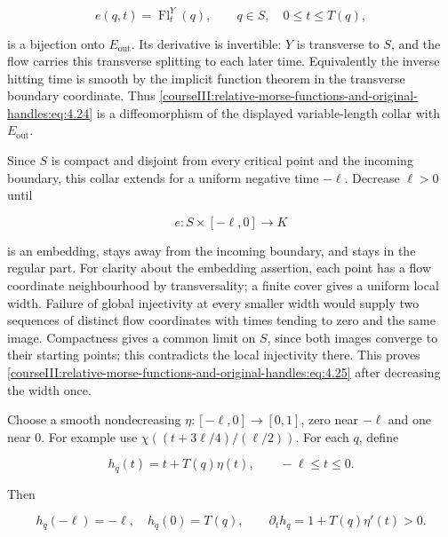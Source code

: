 \begin{equation}
e(q,t)=\operatorname{Fl}^Y_t(q),
\qquad q\in S,\quad 0\leq t\leq T(q),
\label{courseIII:relative-morse-functions-and-original-handles:eq:4.24}
\end{equation}

is a bijection onto \(E_{\mathrm{out}}\). Its derivative is invertible: \(Y\) is transverse to \(S\), and the flow carries this transverse splitting to each later time. Equivalently the inverse hitting time is smooth by the implicit function theorem in the transverse boundary coordinate. Thus \eqref{courseIII:relative-morse-functions-and-original-handles:eq:4.24} is a diffeomorphism of the displayed variable-length collar with \(E_{\mathrm{out}}\).

Since \(S\) is compact and disjoint from every critical point and the incoming boundary, this collar extends for a uniform negative time \(-\ell\). Decrease \(\ell>0\) until

\begin{equation}
e:S\times[-\ell,0]\longrightarrow K
\label{courseIII:relative-morse-functions-and-original-handles:eq:4.25}
\end{equation}

is an embedding, stays away from the incoming boundary, and stays in the regular part. For clarity about the embedding assertion, each point has a flow coordinate neighbourhood by transversality; a finite cover gives a uniform local width. Failure of global injectivity at every smaller width would supply two sequences of distinct flow coordinates with times tending to zero and the same image. Compactness gives a common limit on \(S\), since both images converge to their starting points; this contradicts the local injectivity there. This proves \eqref{courseIII:relative-morse-functions-and-original-handles:eq:4.25} after decreasing the width once.

Choose a smooth nondecreasing \(\eta:[-\ell,0]\to[0,1]\), zero near \(-\ell\) and one near \(0\). For example use \(\chi((t+3\ell/4)/(\ell/2))\). For each \(q\), define

\begin{equation}
h_q(t)=t+T(q)\eta(t),\qquad -\ell\leq t\leq0.
\label{courseIII:relative-morse-functions-and-original-handles:eq:4.26}
\end{equation}

Then

\begin{equation}
h_q(-\ell)=-\ell,\quad h_q(0)=T(q),\qquad
\partial_t h_q=1+T(q)\eta'(t)>0.
\label{courseIII:relative-morse-functions-and-original-handles:eq:4.27}
\end{equation}

